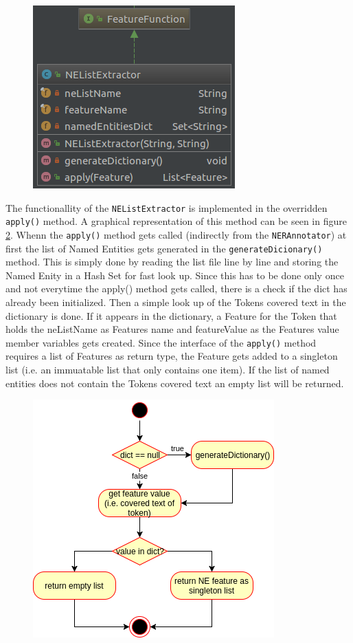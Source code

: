\documentclass[11pt, english]{article}
\begin{document}
\begin{figure}
    \centering
    \includegraphics[scale=0.5]{gfx/NEListExtractor.png}
    \label{fig:NEListExtractor}
\end{figure}

The functionallity of the \verb/NEListExtractor/ is implemented in the overridden \verb/apply()/ method. A graphical representation of this method can be seen in figure \ref{fig:NEListExtractorApply}. Whenn the \verb/apply()/ method gets called (indirectly from the \verb/NERAnnotator/) at first the list of Named Entities gets generated in the \verb/generateDicionary()/ method. This is simply done by reading the list file line by line and storing the Named Enity in a Hash Set for fast look up. Since this has to be done only once and not everytime the apply() method gets called, there is a check if the dict has already been initialized. Then a simple look up of the Tokens covered text in the dictionary is done. If it appears in the dictionary, a Feature for the Token that holds the neListName as Features name and featureValue as the Features value member variables gets created. Since the interface of the \verb/apply()/ method requires a list of Features as return type, the Feature gets added to a singleton list (i.e. an immuatable list that only contains one item). If the list of named entities does not contain the Tokens covered text an empty list will be returned.
\begin{figure}
    \includegraphics[scale=0.75]{gfx/apply.png}
    \label{fig:NEListExtractorApply}
\end{figure}
\end{document}
